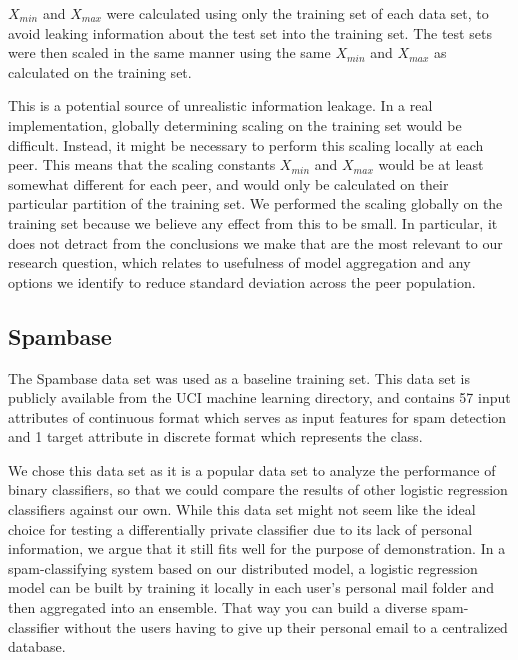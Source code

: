$X_{min}$ and $X_{max}$ were calculated using only the training set of each data set, to avoid leaking information about the test set into the training set. The test sets were then scaled in the same manner using the same $X_{min}$ and $X_{max}$ as calculated on the training set.

This is a potential source of unrealistic information leakage. In a real implementation, globally determining scaling on the training set would be difficult. Instead, it might be necessary to perform this scaling locally at each peer. This means that the scaling constants $X_{min}$ and $X_{max}$ would be at least somewhat different for each peer, and would only be calculated on their particular partition of the training set. We performed the scaling globally on the training set because we believe any effect from this to be small. In particular, it does not detract from the conclusions we make that are the most relevant to our research question, which relates to usefulness of model aggregation and any options we identify to reduce standard deviation across the peer population.  

\subsection{Spambase} \label{sec:spambase}
The Spambase data set \cite{spambase1999data} was used as a baseline training set. This data set is publicly available from the UCI machine learning directory, and contains 57 input attributes of continuous format which serves as input features for spam detection and 1 target attribute in discrete format which represents the class.

We chose this data set as it is a popular data set to analyze the performance of binary classifiers, so that we could compare the results of other logistic regression classifiers against our own. While this data set might not seem like the ideal choice for testing a differentially private classifier due to its lack of personal information, we argue that it still fits well for the purpose of demonstration. In a spam-classifying system based on our distributed model, a logistic regression model can be built by training it locally in each user's personal mail folder and then aggregated into an ensemble. That way you can build a diverse spam-classifier without the users having to give up their personal email to a centralized database.     

